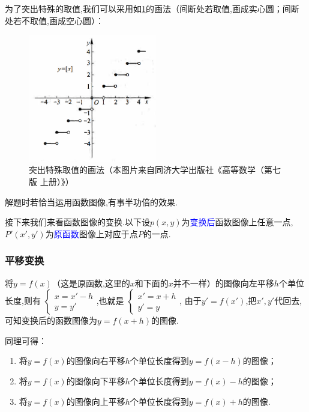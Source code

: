 \documentclass[lang=cn,math=cm,chinesefont=nofont,11pt,scheme=chinese,twocol]{elegantbook}
\begin{document}
为了突出特殊的取值,我们可以采用如\ref{img:2.1.5function6}的画法（间断处若取值,画成实心圆；间断处若不取值,画成空心圆）：

\begin{figure}[h]
  \centering
  \includegraphics[width=0.5\textwidth]{image/2.1.5function6.png}
  \caption{突出特殊取值的画法（本图片来自同济大学出版社《高等数学（第七版 上册）》）}
  \label{img:2.1.5function6}
\end{figure}

解题时若恰当运用函数图像,有事半功倍的效果.

接下来我们来看函数图像的变换.以下设$p(x,y)$为\textcolor{blue}{变换后}函数图像上任意一点,$P'(x',y')$为\textcolor{blue}{原函数}图像上对应于点$P$的一点.

\subsubsection{平移变换}

将$y=f(x)$（这是原函数,这里的$x$和下面的$x$并不一样）的图像向左平移$h$个单位长度,则有
$\begin{cases}
  x=x'-h
  \\y=y'
\end{cases}$,也就是
$\begin{cases}
  x'=x+h
  \\y'=y
\end{cases}$,
由于$y'=f(x')$,把$x',y'$代回去,可知变换后的函数图像为$y=f(x+h)$的图像.

同理可得：

\begin{enumerate}
  \item 将$y=f(x)$的图像向右平移$h$个单位长度得到$y=f(x-h)$的图像；
  \item 将$y=f(x)$的图像向下平移$h$个单位长度得到$y=f(x)-h$的图像；
  \item 将$y=f(x)$的图像向上平移$h$个单位长度得到$y=f(x)+h$的图像.
\end{enumerate}
\end{document}
